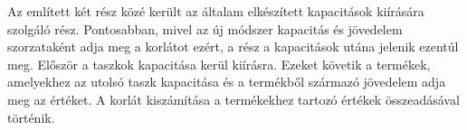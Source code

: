 Az említett két rész közé került az általam elkészített kapacitások kiírására szolgáló rész. Pontosabban, mivel az új módszer kapacitás és jövedelem szorzataként adja meg a korlátot ezért, a rész a kapacitások utána jelenik ezentúl meg. Először a taszkok kapacitása kerül kiírásra. Ezeket követik a termékek, amelyekhez az utolsó taszk kapacitása és a termékből származó jövedelem adja meg az értéket. A korlát kiszámítása a termékekhez tartozó értékek összeadásával történik.